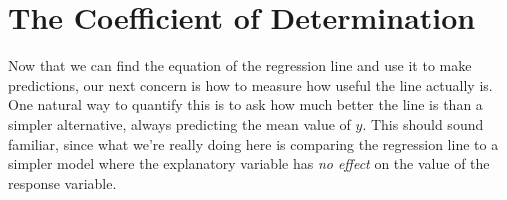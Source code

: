 

\section{The Coefficient of Determination}

Now that we can find the equation of the regression line and use it to make predictions, our next concern is how to measure how useful the line actually is. One natural way to quantify this is to ask how much better the line is than a simpler alternative, always predicting the mean value of $y$. This should sound familiar, since what we're really doing here is comparing the regression line to a simpler model where the explanatory variable has \emph{no effect} on the value of the response variable.

